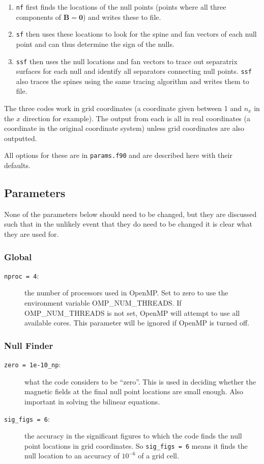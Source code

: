\documentclass[12pt]{article}
\renewcommand{\vec}[1]{\mathbf{#1}}
\begin{document}
    \begin{enumerate}
      \item \texttt{nf} first finds the locations of the null points (points where all three components of \( \vec{B} = \vec{0} \)) and writes these to file.
      \item \texttt{sf} then uses these locations to look for the spine and fan vectors of each null point and can thus determine the sign of the nulls.
      \item \texttt{ssf} then uses the null locations and fan vectors to trace out separatrix surfaces for each null and identify all separators connecting null points. \texttt{ssf} also traces the spines using the same tracing algorithm and writes them to file.
    \end{enumerate}
    The three codes work in grid coordinates (a coordinate given between 1 and \( n_x \) in the \( x \) direction for example). The output from each is all in real coordinates (a coordinate in the original coordinate system) unless grid coordinates are also outputted.

    All options for these are in \texttt{params.f90} and are described here with their defaults.
    
    \subsection{Parameters}
      \label{sec:params}

      None of the parameters below should need to be changed, but they are discussed such that in the unlikely event that they do need to be changed it is clear what they are used for.
      
      \subsubsection{Global}
        \begin{description}
          \item [\texttt{nproc = 4}:] the number of processors used in OpenMP. Set to zero to use the environment variable OMP\_NUM\_THREADS. If OMP\_NUM\_THREADS is not set, OpenMP will attempt to use all available cores. This parameter will be ignored if OpenMP is turned off.
        \end{description}

      \subsubsection{Null Finder}
        \begin{description}
          \item [\texttt{zero = 1e-10\_np}:] what the code considers to be ``zero''. This is used in deciding whether the magnetic fields at the final null point locations are small enough. Also important in solving the bilinear equations.
          \item [\texttt{sig\_figs = 6}:] the accuracy in the significant figures to which the code finds the null point locations in grid coordinates. So \texttt{sig\_figs = 6} means it finds the null location to an accuracy of \( 10^{-6} \) of a grid cell.
        \end{description}
\end{document}
